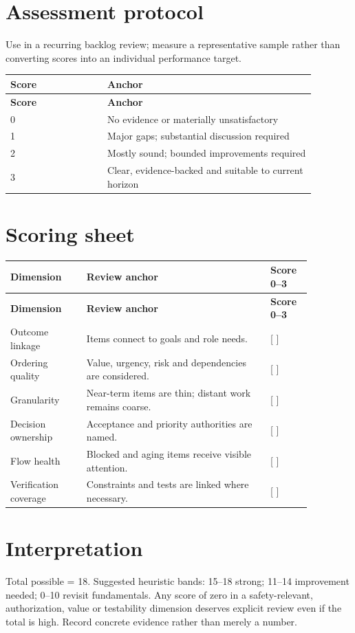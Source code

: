 \documentclass[11pt,letterpaper]{article}
\begin{document}
\section{Assessment protocol}
Use in a recurring backlog review; measure a representative sample rather than converting scores into an individual performance target.

\begin{longtable}{|p{0.28\linewidth}|p{0.60\linewidth}|}\hline
\textbf{Score} & \textbf{Anchor} \\ \hline\endfirsthead\hline
\textbf{Score} & \textbf{Anchor} \\ \hline\endhead
0 & No evidence or materially unsatisfactory \\ \hline
1 & Major gaps; substantial discussion required \\ \hline
2 & Mostly sound; bounded improvements required \\ \hline
3 & Clear, evidence-backed and suitable to current horizon \\ \hline
\end{longtable}
\section{Scoring sheet}
\begin{longtable}{|p{0.22\linewidth}|p{0.53\linewidth}|p{0.12\linewidth}|}\hline
\textbf{Dimension} & \textbf{Review anchor} & \textbf{Score 0--3} \\ \hline\endfirsthead
\textbf{Dimension} & \textbf{Review anchor} & \textbf{Score 0--3} \\ \hline\endhead
Outcome linkage & Items connect to goals and role needs. & [  ] \\ \hline
Ordering quality & Value, urgency, risk and dependencies are considered. & [  ] \\ \hline
Granularity & Near-term items are thin; distant work remains coarse. & [  ] \\ \hline
Decision ownership & Acceptance and priority authorities are named. & [  ] \\ \hline
Flow health & Blocked and aging items receive visible attention. & [  ] \\ \hline
Verification coverage & Constraints and tests are linked where necessary. & [  ] \\ \hline
\end{longtable}
\section{Interpretation}
Total possible = 18. Suggested heuristic bands: 15–18 strong; 11–14 improvement needed; 0–10 revisit fundamentals. Any score of zero in a safety-relevant, authorization, value or testability dimension deserves explicit review even if the total is high. Record concrete evidence rather than merely a number.
\end{document}
